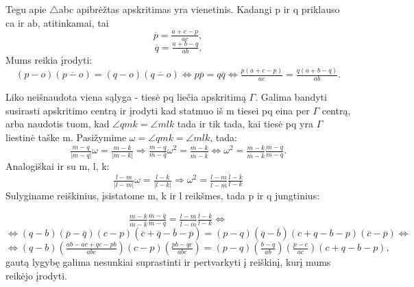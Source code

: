 \begin{sprendimas}

Tegu apie $\bigtriangleup$abc apibrėžtas apskritimas yra vienetinis. Kadangi p ir q priklauso ca ir ab, atitinkamai, tai
\begin{equation*}
\overline{p}=\tfrac{a+c-p}{ac},
\end{equation*}
\begin{equation*}
\overline{q}=\tfrac{a+b-q}{ab}.
\end{equation*}
Mums reikia įrodyti:
\begin{equation*}
(p-o)(\overline{p-o})=(q-o)(\overline{q-o}) \Leftrightarrow p\overline{p}=q\overline{q} \Leftrightarrow \tfrac{p(a+c-p)}{ac}=\tfrac{q(a+b-q)}{ab}.
\end{equation*}

Liko neišnaudota viena sąlyga - tiesė pq liečia apskritimą $\Gamma$. Galima bandyti susirasti apskritimo centrą ir įrodyti kad statmuo iš m tiesei pq eina per $\Gamma$ centrą, arba naudotis tuom, kad $\angle qmk=\angle mlk$ tada ir tik tada, kai tiesė pq yra $\Gamma$ liestinė taške m. Pasižymime $\omega=\angle qmk=\angle mlk$, tada:
\begin{equation*}
\tfrac{m-q}{|m-q|}\omega=\tfrac{m-k}{|m-k|} \Rightarrow \tfrac{m-q}{\overline{m}-\overline{q}}\omega^2=\tfrac{m-k}{\overline{m}-\overline{k}} \Leftrightarrow \omega^2=\tfrac{m-k}{\overline{m}-\overline{k}} \tfrac{\overline{m}-\overline{q}}{m-q}.
\end{equation*}
Analogiškai ir su m, l, k:
\begin{equation*}
\tfrac{l-m}{|l-m|}\omega=\tfrac{l-k}{|l-k|} \Rightarrow  \omega^2=\tfrac{l-m}{\overline{l}-\overline{m}}\tfrac{\overline{l}-\overline{k}}{l-k}
\end{equation*}
Sulyginame reiškinius, įsistatome m, k ir l reikšmes, tada p ir q jungtinius:

\begin{equation*}
 \tfrac{m-k}{\overline{m}-\overline{k}} \tfrac{\overline{m}-\overline{q}}{m-q}=\tfrac{l-m}{\overline{l}-\overline{m}}\tfrac{\overline{l}-\overline{k}}{l-k} \Leftrightarrow 
\end{equation*}
\begin{equation*}
 \Leftrightarrow (q-b)(\overline{p}-\overline{q})(c-p)(\overline{c}+\overline{q}-\overline{b}-\overline{p})=(p-q)(\overline{q}-\overline{b})(c+q-b-p)(\overline{c}-\overline{p}) \Leftrightarrow
\end{equation*}
\begin{equation*}
\Leftrightarrow (q-b)(\tfrac{ab-ac+qc-pb}{abc})(c-p)(\tfrac{pb-qc}{abc})=(p-q)(\tfrac{b-q}{ab})(\tfrac{p-c}{ac})(c+q-b-p),
\end{equation*}
gautą lygybę galima nesunkiai suprastinti ir pertvarkyti į reiškinį, kurį mums reikėjo įrodyti.
\end{sprendimas}

